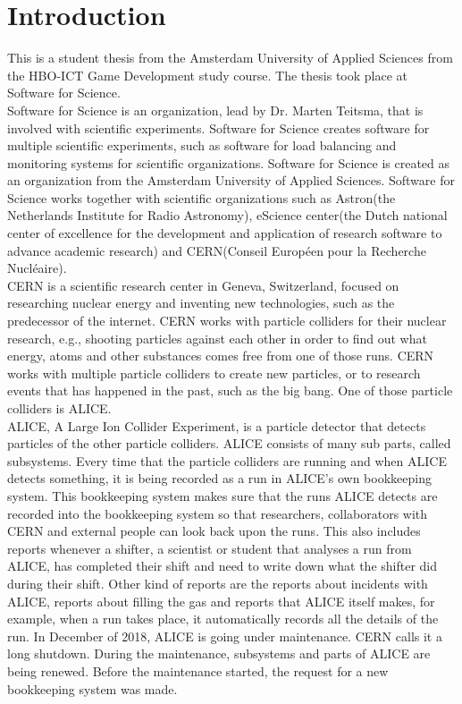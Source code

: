 \documentclass[paper=a4, fontsize=11pt,twoside]{scrartcl}	%
\begin{document}
\section{Introduction}
This is a student thesis from the Amsterdam University of Applied Sciences from the HBO-ICT Game Development study course. The thesis took place at Software for Science. \\
Software for Science is an organization, lead by Dr. Marten Teitsma, that is involved with scientific experiments. Software for Science creates software for multiple scientific experiments, such as software for load balancing and monitoring systems for scientific organizations. Software for Science is created as an organization from the Amsterdam University of Applied Sciences. Software for Science works together with scientific organizations such as Astron(the Netherlands Institute for Radio Astronomy), eScience center(the Dutch national center of excellence for the development and application of research software to advance academic research) and CERN(Conseil Européen pour la Recherche Nucléaire). \\
CERN is a scientific research center in Geneva, Switzerland, focused on researching nuclear energy and inventing new technologies, such as the predecessor of the internet. CERN works with particle colliders for their nuclear research, e.g., shooting particles against each other in order to find out what energy, atoms and other substances comes free from one of those runs. CERN works with multiple particle colliders to create new particles, or to research events that has happened in the past, such as the big bang. One of those particle colliders is ALICE. \\
ALICE, A Large Ion Collider Experiment, is a particle detector that detects particles of the other particle colliders. ALICE consists of many sub parts, called subsystems. Every time that the particle colliders are running and when ALICE detects something, it is being recorded as a run in ALICE's own bookkeeping system. This bookkeeping system makes sure that the runs ALICE detects are recorded into the bookkeeping system so that researchers, collaborators with CERN and external people can look back upon the runs. This also includes reports whenever a shifter, a scientist or student that analyses a run from ALICE, has completed their shift and need to write down what the shifter did during their shift. Other kind of reports are the reports about incidents with ALICE, reports about filling the gas and reports that ALICE itself makes, for example, when a run takes place, it automatically records all the details of the run. In December of 2018, ALICE is going under maintenance. CERN calls it a long shutdown. During the maintenance, subsystems and parts of ALICE are being renewed. Before the maintenance started, the request for a new bookkeeping system was made. \\
\end{document}
